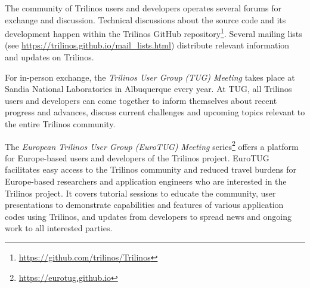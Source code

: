 

The community of Trilinos users and developers operates several forums for exchange and discussion.
Technical discussions about the source code and its development happen within the Trilinos GitHub repository\footnote{\url{https://github.com/trilinos/Trilinos}}.
Several mailing lists (see \url{https://trilinos.github.io/mail_lists.html}) distribute relevant information and updates on Trilinos.

For in-person exchange, the \emph{Trilinos User Group (TUG) Meeting} takes place at Sandia National Laboratories in Albuquerque every year.
At TUG, all Trilinos users and developers can come together to inform themselves about recent progress and advances,
discuss current challenges and upcoming topics relevant to the entire Trilinos community.

The \emph{European Trilinos User Group (EuroTUG) Meeting} series\footnote{\url{https://eurotug.github.io}}
offers a platform for Europe-based users and developers of the Trilinos project.
EuroTUG facilitates easy access to the Trilinos community and reduced travel burdens for Europe-based researchers and application engineers
who are interested in the Trilinos project.
It covers tutorial sessions to educate the community,
user presentations to demonstrate capabilities and features of various application codes using Trilinos,
and updates from developers to spread news and ongoing work to all interested parties.
